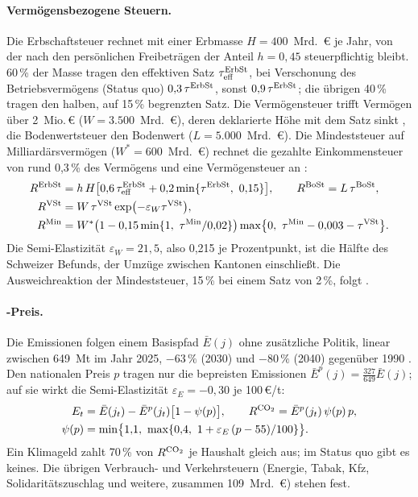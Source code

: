 \paragraph{Vermögensbezogene Steuern.} Die Erbschaftsteuer rechnet mit einer
Erbmasse $H = 400$~Mrd.~\euro{} je Jahr, von der nach den persönlichen
Freibeträgen der Anteil $h = 0{,}45$ steuerpflichtig bleibt. 60\,\% der Masse
tragen den effektiven Satz $\tau^{\mathrm{ErbSt}}_{\mathrm{eff}}$, bei Verschonung
des Betriebsvermögens (Status quo) $0{,}3\,\tau^{\mathrm{ErbSt}}$, sonst
$0{,}9\,\tau^{\mathrm{ErbSt}}$; die übrigen 40\,\% tragen den halben, auf 15\,\%
begrenzten Satz. Die Vermögensteuer trifft Vermögen über
2~Mio.\,\euro{} ($W = 3.500$~Mrd.~\euro), deren deklarierte Höhe mit dem Satz
sinkt \parencite{bruelhart2022}, die Bodenwertsteuer den Bodenwert
($L = 5.000$~Mrd.~\euro). Die Mindeststeuer auf Milliardärsvermögen
($W^{*} = 600$~Mrd.~\euro) rechnet die gezahlte Einkommensteuer von rund
0,3\,\% des Vermögens und eine Vermögensteuer an \parencite{zucman2024}:
\begin{align}
  R\hoch{ErbSt} &= h\,H\bigl[0{,}6\,\tau\hoch{ErbSt}_{\mathrm{eff}} + 0{,}2\min\{\tau\hoch{ErbSt},\ 0{,}15\}\bigr],
  \qquad R\hoch{BoSt} = L\,\tau\hoch{BoSt},\\
  R\hoch{VSt} &= W\,\tau\hoch{VSt}\exp\bigl(-\varepsilon_W\tau\hoch{VSt}\bigr),\\
  R\hoch{Min} &= W^{*}\bigl(1 - 0{,}15\min\{1,\ \tau\hoch{Min}/0{,}02\}\bigr)\max\bigl\{0,\ \tau\hoch{Min} - 0{,}003 - \tau\hoch{VSt}\bigr\}.
\end{align}
Die Semi-Elastizität $\varepsilon_W = 21{,}5$, also 0,215 je Prozentpunkt, ist
die Hälfte des Schweizer Befunds, der Umzüge zwischen Kantonen einschließt.
Die Ausweichreaktion der Mindeststeuer, 15\,\% bei einem Satz von 2\,\%,
folgt \textcite{jakobsen2024}.

\paragraph{\COz-Preis.} Die Emissionen folgen einem Basispfad $\bar E(j)$ ohne
zusätzliche Politik, linear zwischen 649~Mt im Jahr 2025, $-63\,\%$ (2030) und
$-80\,\%$ (2040) gegenüber 1990 \parencite{uba2025}. Den nationalen Preis $p$
tragen nur die bepreisten Emissionen $\bar E^{p}(j) = \tfrac{327}{649}\bar E(j)$;
auf sie wirkt die Semi-Elastizität $\varepsilon_E = -0{,}30$ je 100\,\euro/t:
\begin{equation}
\begin{split}
  E_t &= \bar E(j_t) - \bar E^{p}(j_t)\bigl[1 - \psi(p)\bigr],\qquad
  R^{\mathrm{CO_2}} = \bar E^{p}(j_t)\,\psi(p)\,p,\\
  \psi(p) &= \min\bigl\{1{,}1,\ \max\{0{,}4,\ 1 + \varepsilon_E\,(p - 55)/100\}\bigr\}.
\end{split}
\end{equation}
Ein Klimageld zahlt 70\,\% von $R^{\mathrm{CO_2}}$ je Haushalt gleich aus; im
Status quo gibt es keines. Die übrigen Verbrauch- und Verkehrsteuern (Energie,
Tabak, Kfz, Solidaritätszuschlag und weitere, zusammen 109~Mrd.~\euro) stehen
fest.

